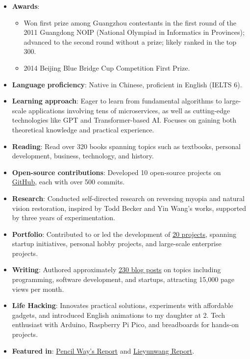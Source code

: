 \documentclass[11pt, a4paper]{latex/awesome-cv}
\begin{document}
\begin{itemize}
    \item \textbf{Awards}:
        \begin{itemize}
            \item Won first prize among Guangzhou contestants in the first round of the 2011 Guangdong NOIP (National Olympiad in Informatics in Provinces); advanced to the second round without a prize; likely ranked in the top 300.
            \item 2014 Beijing Blue Bridge Cup Competition First Prize.
        \end{itemize}
    \item \textbf{Language proficiency}: Native in Chinese, proficient in English (IELTS 6).
    \item \textbf{Learning approach}: Eager to learn from fundamental algorithms to large-scale applications involving tens of microservices, as well as cutting-edge technologies like GPT and Transformer-based AI. Focuses on gaining both theoretical knowledge and practical experience.
    \item \textbf{Reading}: Read over 320 books spanning topics such as textbooks, personal development, business, technology, and history.
    \item \textbf{Open-source contributions}: Developed 10 open-source projects on \href{https://github.com/lzwjava}{GitHub}, each with over 500 commits.
    \item \textbf{Research}: Conducted self-directed research on reversing myopia and natural vision restoration, inspired by Todd Becker and Yin Wang’s works, supported by three years of experimentation.
    \item \textbf{Portfolio}: Contributed to or led the development of \href{https://lzwjava.com/pages/portfolio-en}{20 projects}, spanning startup initiatives, personal hobby projects, and large-scale enterprise projects.
    \item \textbf{Writing}: Authored approximately \href{https://lzwjava.com}{230 blog posts} on topics including programming, software development, and startups, attracting 15,000 page views per month.
    \item \textbf{Life Hacking}: Innovates practical solutions, experiments with affordable gadgets, and introduced English animations to my daughter at 2. Tech enthusiast with Arduino, Raspberry Pi Pico, and breadboards for hands-on projects.
    \item \textbf{Featured in}: \href{https://www.pencilnews.cn/p/13402.html}{Pencil Way's Report} and \href{https://lieyunpro.com/archives/290646}{Lieyunwang Report}.
\end{itemize}
\end{document}
